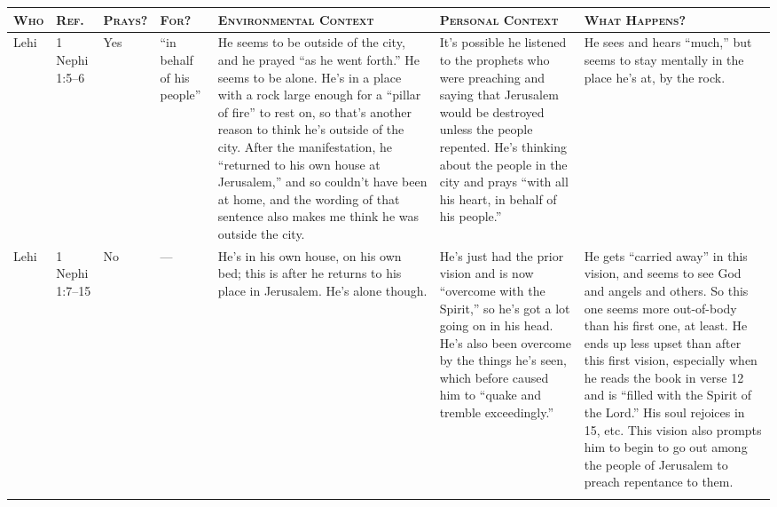 			\begin{longtable}{p{1cm}|p{1cm}|p{0.75cm}|p{1.5cm}|p{4cm}|p{4cm}|p{3.5cm}}
				
				\textbf{\textsc{Who}} & \textbf{\textsc{Ref.}} & \textbf{\textsc{Prays?}} & \textbf{\textsc{For?}} & \textbf{\textsc{Environmental Context}} & \textbf{\textsc{Personal Context}} & \textbf{\textsc{What Happens?}} \\ \hline
				
				Lehi &
				1 Nephi 1:5--6 &
				Yes &
				``in behalf of his people'' &
				\textbf{\tr{Outside, by a rock, alone.}} He seems to be outside of the city, and he prayed ``as he went forth.'' He seems to be alone. He's in a place with a rock large enough for a ``pillar of fire'' to rest on, so that's another reason to think he's outside of the city. After the manifestation, he ``returned to his own house at Jerusalem,'' and so couldn't have been at home, and the wording of that sentence also makes me think he was outside the city. &
				It's possible he listened to the prophets who were preaching and saying that Jerusalem would be destroyed unless the people repented. He's thinking about the people in the city and prays ``with all his heart, in behalf of his people.'' &
				He sees and hears ``much,'' but seems to stay mentally in the place he's at, by the rock. \\ \hline
				
				Lehi &
				1 Nephi 1:7--15 & 
				No & 
				--- & 
				\textbf{\tr{At home in his room, alone.}} He's in his own house, on his own bed; this is after he returns to his place in Jerusalem. He's alone though. & 
				He's just had the prior vision and is now ``overcome with the Spirit,'' so he's got a lot going on in his head. He's also been overcome by the things he's seen, which before caused him to ``quake and tremble exceedingly.'' & 
				He gets ``carried away'' in this vision, and seems to see God and angels and others. So this one seems more out-of-body than his first one, at least. He ends up less upset than after this first vision, especially when he reads the book in verse 12 and is ``filled with the Spirit of the Lord.'' His soul rejoices in 15, etc. This vision also prompts him to begin to go out among the people of Jerusalem to preach repentance to them. \\ \hline
				
				 & %
				 & %
				 & %
				 & %
				 & %
				 & %
				 \\ \hline %
				 
		
			\end{longtable}
		

